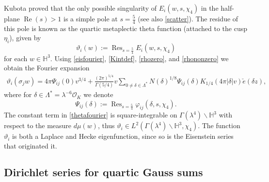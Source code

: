 \documentclass[12pt,reqno]{amsart}
\numberwithin{equation}{section}
\renewcommand{\Re}{\operatorname{Re}}
\DeclareMathOperator*{\Res}{Res}
\begin{document}
Kubota proved \cite[Chapter 6]{Kub} that the only possible singularity of $E_{i}(w,s,\chi_4)$ in the half-plane $\Re(s)>1$ is a simple pole at $s=\frac{5}{4}$ (see also \cref{scatter}). The residue of this pole is known as the quartic metaplectic theta function (attached to the cusp $\eta_i$), given by
\begin{equation} \label{thetadef}
    \vartheta_{i}(w):=\Res_{s=\frac{5}{4}} E_{i}(w,s,\chi_4)
\end{equation}
 for each $w \in \mathbb{H}^3$.
Using \eqref{eisfourier}, \eqref{Kintdef}, \eqref{rhozero}, and \eqref{rhononzero} we obtain the Fourier expansion 
\begin{align} \label{thetafourier}
    \vartheta_{i}(\sigma_{j} w) = 4\pi \Psi_{ij}(0)  v^{3/4} +\frac{(2 \pi)^{5/4}}{\Gamma(5/4)} v \sum_{0 \neq \delta \in \Lambda^{*}} N(\delta)^{1/8} \Psi_{ij}(\delta) K_{1/4}(4 \pi |{\delta}|v) \check{e}(\delta z), \qquad
\end{align}
where for $\delta \in \Lambda^* = \lambda^{-6}\mathcal{O}_K$ we denote 
\begin{equation} \label{psidef}
    \Psi_{ij}(\delta):=\Res_{s=\frac{5}{4}} \varphi_{ij}(\delta,s,\chi_4).
\end{equation} 
The constant term in \eqref{thetafourier} is square-integrable on $\Gamma(\lambda^4) \backslash \mathbb{H}^3$ with respect to the measure $d \mu(w)$, thus $\vartheta_{i} \in L^2(\Gamma(\lambda^4) \backslash \mathbb{H}^3,\chi_4)$. The function $\vartheta_{i}$ is both a Laplace and Hecke eigenfunction, since so is the Eisenstein series that originated it.


\subsection{Dirichlet series for quartic Gauss sums}
\end{document}
